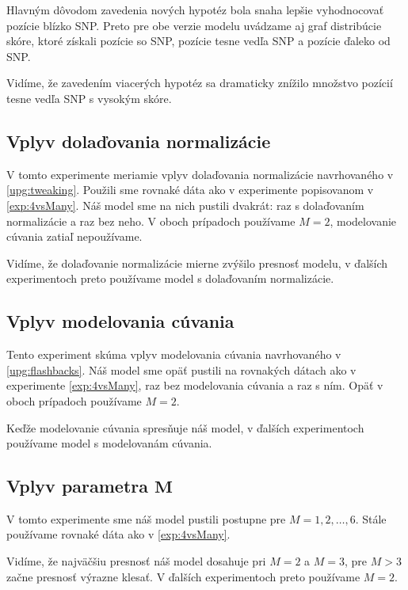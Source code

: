 Hlavným dôvodom zavedenia nových hypotéz bola snaha lepšie vyhodnocovať pozície blízko SNP. Preto 
pre obe verzie modelu uvádzame aj graf distribúcie skóre, ktoré získali pozície so SNP, pozície
tesne vedľa SNP a pozície ďaleko od SNP.


Vidíme, že zavedením viacerých hypotéz sa dramaticky znížilo množstvo pozícií tesne vedľa SNP s
vysokým skóre.

\subsection{Vplyv dolaďovania normalizácie}
\label{exp:tweaking}
V tomto experimente meriamie vplyv dolaďovania normalizácie navrhovaného v \ref{upg:tweaking}. Použili sme 
rovnaké dáta ako v experimente popisovanom v \ref{exp:4vsMany}. Náš model sme na nich pustili dvakrát: 
raz s dolaďovaním
normalizácie a raz bez neho. V oboch prípadoch používame $M=2$, modelovanie cúvania zatiaľ nepoužívame.


Vidíme, že dolaďovanie normalizácie mierne zvýšilo presnosť modelu, v ďalších experimentoch preto
používame model s dolaďovaním normalizácie.

\subsection{Vplyv modelovania cúvania}
\label{exp:flashbacks}
Tento experiment skúma vplyv modelovania cúvania navrhovaného v \ref{upg:flashbacks}. Náš model sme
opäť pustili na rovnakých dátach ako v experimente \ref{exp:4vsMany}, raz bez modelovania cúvania a raz
s ním. Opäť v oboch prípadoch používame $M=2$.


Keďže modelovanie cúvania spresňuje náš model, v ďalších experimentoch používame model s modelovanám
cúvania.

\subsection[Vplyv parametra $M$]{Vplyv parametra $\boldsymbol{M}$}
V tomto experimente sme náš model pustili postupne pre $M = 1, 2, \dots, 6$. Stále používame rovnaké
dáta ako v \ref{exp:4vsMany}.


Vidíme, že najväčšiu presnosť náš model dosahuje pri $M = 2$ a $M = 3$, pre $M > 3$ začne presnosť
výrazne klesať. V ďalších experimentoch preto používame $M = 2$.

